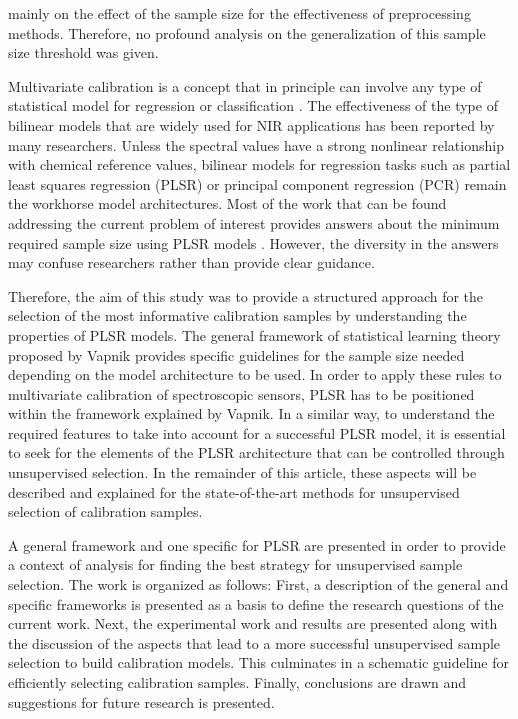 \documentclass[journal=ancham,manuscript=article]{achemso}
\begin{document}
mainly on the effect of the sample size for the effectiveness of preprocessing methods. Therefore, no profound analysis on the generalization of this sample size threshold was given.

Multivariate calibration is a concept that in principle can involve any type of statistical model for regression or classification \cite{Saeys2019}. The effectiveness of the type of bilinear models that are widely used for NIR applications has been reported by many researchers. Unless the spectral values have a strong nonlinear relationship with chemical reference values, bilinear models for regression tasks such as partial least squares regression (PLSR) or principal component regression (PCR) remain the workhorse model architectures\cite{FonsecaDiaz2020}. Most of the work that can be found addressing the current problem of interest provides answers about the minimum required sample size using PLSR models \cite{Naes1990, Au2020, Shetty2012a, Rodionova2008}. However, the diversity in the answers may confuse researchers rather than provide clear guidance. 

Therefore, the aim of this study was to provide a structured approach for the selection of the most informative calibration samples by understanding the properties of PLSR models. The general framework of statistical learning theory proposed by Vapnik provides specific guidelines for the sample size needed depending on the model architecture to be used\cite{Vapnik2019, Vapnik2000}. In order to apply these rules to multivariate calibration of spectroscopic sensors, PLSR has to be positioned within the framework explained by Vapnik. In a similar way, to understand the required features to take into account for a successful PLSR model, it is essential to seek for the elements of the PLSR architecture that can be controlled through unsupervised selection. In the remainder of this article, these aspects will be described and explained for the state-of-the-art methods for unsupervised selection of calibration samples.

A general framework and one specific for PLSR are presented in order to provide a context of analysis for finding the best strategy for unsupervised sample selection. The work is organized as follows: First, a description of the general and specific frameworks is presented as a basis to define the research questions of the current work. Next, the experimental work and results are presented along with the discussion of the aspects that lead to a more successful unsupervised sample selection to build calibration models. This culminates in a schematic guideline for efficiently selecting calibration samples. Finally, conclusions are drawn and suggestions for future research is presented.
\end{document}
